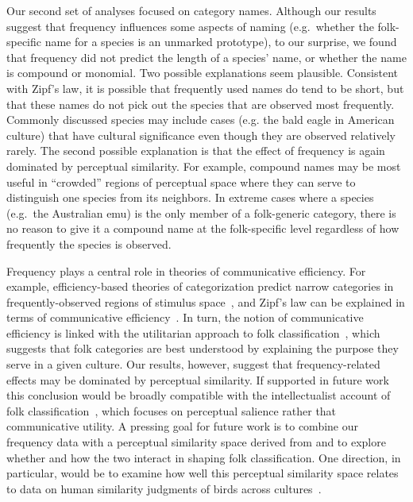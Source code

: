 \documentclass[10pt,letterpaper]{article}
\begin{document}

Our second set of analyses focused on category names. Although our results suggest that frequency influences some aspects of naming (e.g.\ whether the folk-specific name for a species is an unmarked prototype), to our surprise, we found that frequency did not predict the length of a species' name, or whether the name is compound or monomial. Two possible explanations seem plausible. Consistent with Zipf's law, it is possible that frequently used names do tend to be short, but that these names do not pick out the species that are observed most frequently. Commonly discussed species may include cases (e.g. the bald eagle in American culture) that have cultural significance even though they are observed relatively rarely. The second possible explanation is that the effect of frequency is again dominated by perceptual similarity. For example, compound names may be most useful in ``crowded'' regions of perceptual space where they can serve to distinguish one species from its neighbors. In extreme cases where a species (e.g.\ the Australian emu) is the only member of a folk-generic category, there is no reason to give it a compound name at the folk-specific level regardless of how frequently the species is observed. 

Frequency plays a central role in theories of communicative efficiency. For example, efficiency-based theories of categorization predict narrow categories in frequently-observed regions of stimulus space~\cite{regierck16}, and Zipf's law can be explained in terms of communicative efficiency~\cite{ferrericanchos03, piantadosi2014zipf}. In turn, the notion of communicative efficiency is linked with the utilitarian approach to folk classification~\cite{hunn1982utilitarian}, which suggests that folk categories are best understood by explaining the purpose they serve in a given culture. Our results, however, suggest that frequency-related effects may be dominated by perceptual similarity. If supported in future work this conclusion would be broadly compatible with the intellectualist account of folk classification~\cite{berlin2014ethnobiological}, which focuses on perceptual salience rather that communicative utility. A pressing goal for future work is to combine our frequency data with a perceptual similarity space derived from \cite{pigot2020macroevolutionary} and to explore whether and how the two interact in shaping folk classification. One direction, in particular, would be to examine how well this perceptual similarity space relates to data on human similarity judgments of birds across cultures~\cite{boster1988natural,bailenson2002bird}.
\end{document}
